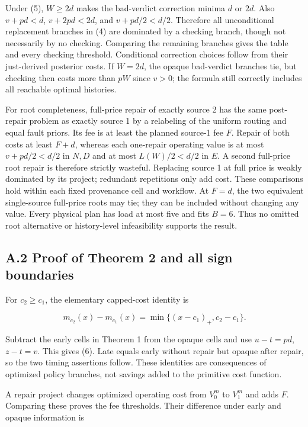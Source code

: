 \documentclass[
  11pt,
  a4paper,
]{article}
\begin{document}
Under (5), \(W\geq2d\) makes the bad-verdict correction minima \(d\) or
\(2d\). Also \(v+pd<d\), \(v+2pd<2d\), and \(v+pd/2<d/2\). Therefore all
unconditional replacement branches in (4) are dominated by a checking
branch, though not necessarily by no checking. Comparing the remaining
branches gives the table and every checking threshold. Conditional
correction choices follow from their just-derived posterior costs. If
\(W=2d\), the opaque bad-verdict branches tie, but checking then costs
more than \(pW\) since \(v>0\); the formula still correctly includes all
reachable optimal histories.

For root completeness, full-price repair of exactly source 2 has the
same post-repair problem as exactly source 1 by a relabeling of the
uniform routing and equal fault priors. Its fee is at least the planned
source-1 fee \(F\). Repair of both costs at least \(F+d\), whereas each
one-repair operating value is at most \(v+pd/2<d/2\) in \(N,D\) and at
most \(L(W)/2<d/2\) in \(E\). A second full-price root repair is
therefore strictly wasteful. Replacing source 1 at full price is weakly
dominated by its project; redundant repetitions only add cost. These
comparisons hold within each fixed provenance cell and workflow. At
\(F=d\), the two equivalent single-source full-price roots may tie; they
can be included without changing any value. Every physical plan has load
at most five and fits \(B=6\). Thus no omitted root alternative or
history-level infeasibility supports the result.

\subsection{A.2 Proof of Theorem 2 and all sign
boundaries}\label{a.2-proof-of-theorem-2-and-all-sign-boundaries}

For \(c_2\geq c_1\), the elementary capped-cost identity is

\[m_{c_2}(x)-m_{c_1}(x)=\min\{(x-c_1)_+,c_2-c_1\}.\tag{17}\]

Subtract the early cells in Theorem 1 from the opaque cells and use
\(u-t=pd\), \(z-t=v\). This gives (6). Late equals early without repair
but opaque after repair, so the two timing assertions follow. These
identities are consequences of optimized policy branches, not savings
added to the primitive cost function.

A repair project changes optimized operating cost from \(V_0^m\) to
\(V_1^m\) and adds \(F\). Comparing these proves the fee thresholds.
Their difference under early and opaque information is
\end{document}
